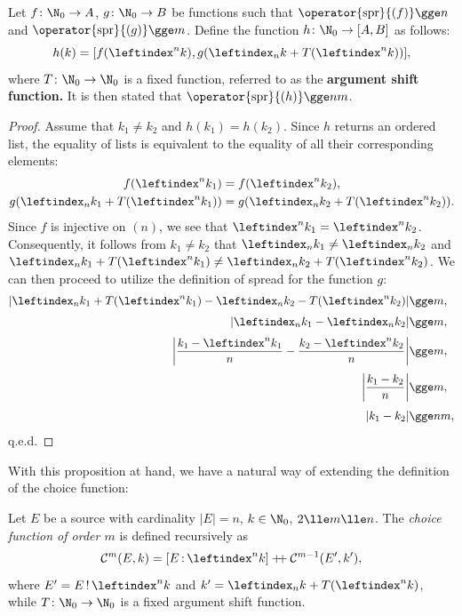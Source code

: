 \documentclass[12pt, a4paper]{article}
\renewcommand{\C}{\mathcal{C}}
\newcommand{\dop}{\mathbin{{+}\hspace{-1mm}{+}}}
\newcommand{\spr}[1]{\operator{\mathrm{spr}}{\left(#1\right)}}
\newcommand{\lli}[1]{\leftindex_{#1}}
\newcommand{\lui}[1]{\leftindex^{#1}}
\newcommand{\elt}{\mathop{:}}
\newcommand{\wo}{\mathop{!}}
\begin{document}
\begin{proposition}\label{map}
    Let $ f \colon \N_0 \to A $, $ g \colon \N_0 \to B $ be functions such that $ \spr{f} \gge n $ and $ \spr{g} \gge m $. Define the function $ h \colon \N_0 \to [A, B] $ as follows:
    \[ h(k) = [f(\lui{n}k), g(\lli{n}k + T(\lui{n}k))], \]
    where $ T \colon \N_0 \to \N_0 $ is a fixed function, referred to as the \textbf{argument shift function.} It is then stated that $ \spr{h} \gge nm $.
\end{proposition}
\begin{proof}
    Assume that $ k_1 \ne k_2 $ and $ h(k_1) = h(k_2) $. Since $ h $ returns an ordered list, the equality of lists is equivalent to the equality of all their corresponding elements:
    \begin{gather*}
        f(\lui{n}k_1) = f(\lui{n}k_2),\label{one}\\
        g(\lli{n}k_1 + T(\lui{n}k_1)) = g(\lli{n}k_2 + T(\lui{n}k_2)).\label{two}
    \end{gather*}
    Since $ f $ is injective on $ (n) $, we see that $ \lui{n}k_1 = \lui{n}k_2 $. Consequently, it follows from $ k_1 \ne k_2 $ that $ \lli{n}k_1 \ne \lli{n}k_2 $ and $ \lli{n}k_1 + T(\lui{n}k_1) \ne \lli{n}k_2 + T(\lui{n}k_2) $. We can then proceed to utilize the definition of spread for the function $ g $:
    \begin{align*}
    | \lli{n}k_1 + T(\lui{n}k_1) - \lli{n}k_2 - T(\lui{n}k_2) | &\gge m,\\[1mm]
    | \lli{n}k_1 - \lli{n}k_2 | &\gge m,\\[1mm]
    \left| \frac{k_1 - \lui{n}k_1}{n} - \frac{k_2 - \lui{n}k_2}{n} \right| &\gge m,\\[1mm]
    \left| \frac{k_1 - k_2}{n} \right| &\gge m,\\[1mm]
    | k_1 - k_2 | &\gge nm,
    \end{align*}
    q.e.d.
\end{proof}

With this proposition at hand, we have a natural way of extending the definition of the choice function:

\begin{definition}
    Let $ E $ be a source with cardinality $ |E| = n $, $ k \in \N_0 $, $ 2 \lle m \lle n $. The \emph{choice function of order $ m $} is defined recursively as
    \[ \C^m(E, k) = [E \elt \lui{n}k] \dop \C^{m-1}(E', k'), \]
    where $ E' = E \wo \lui{n}k $ and $ k' = \lli{n}k + T(\lui{n}k) $, while $ T \colon \N_0 \to \N_0 $ is a fixed argument shift function.
\end{definition}
\end{document}
